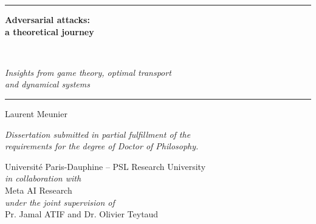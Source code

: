 
\begin{titlepage}

	\begin{center}
    \textcolor{PSLBlue}{\hrule}
    \vskip 0.8cm
        \begin{center}
            \begin{Huge}
                \textcolor{PSLBlue}{\textbf{Adversarial attacks:\\ a theoretical journey}
                }
            \end{Huge}\\[10pt]
            \begin{LARGE}
                \textcolor{PSLBlue}{\emph{Insights from game theory, optimal transport\\ and dynamical systems}}
            \end{LARGE}
        \end{center}
    \vskip 0.1cm
    \textcolor{PSLBlue}{\hrule}
    \vskip 1cm
        \begin{Large}
        Laurent Meunier
        \end{Large}
		\vfill
	    \begin{Large}	
   	     \emph{Dissertation submitted in partial fulfillment of the \\ requirements for the degree of Doctor of Philosophy.}
        \end{Large}
                 
    	\vfill
    	
	\begin{Large}
	   Universit\'e Paris-Dauphine -- PSL Research University \\[0.5cm] 
	   \emph{in collaboration with} \\[0.5cm] 
	   Meta AI Research \\[0.5cm] 
	   \emph{under the joint supervision of} \\[0.5cm]
                    
        Pr. Jamal ATIF and Dr. Olivier Teytaud
	\end{Large}
\end{center}

\newpage
\null
\thispagestyle{empty}
\newpage

\end{titlepage}






